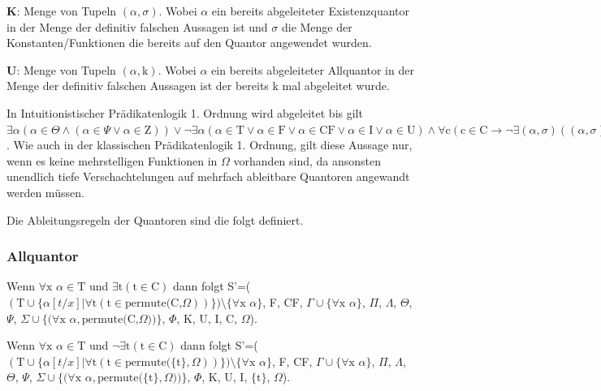 \begin{description}
\item \textbf{K}: Menge von Tupeln $(\alpha, \sigma)$. Wobei $\alpha$ ein bereits abgeleiteter Existenzquantor in der Menge der definitiv falschen Aussagen ist und $\sigma$ die Menge der Konstanten/Funktionen die bereits auf den Quantor angewendet wurden.

\item \textbf{U}: Menge von Tupeln $(\alpha, \textrm{k})$. Wobei $\alpha$ ein bereits abgeleiteter Allquantor in der Menge der definitiv falschen Aussagen ist der bereits k mal abgeleitet wurde.
\end{description}

In Intuitionistischer Prädikatenlogik 1. Ordnung wird abgeleitet bis gilt $\exists\alpha(\alpha\in\Theta\wedge(\alpha\in\Psi\vee\alpha\in\textrm{Z}))\vee\neg\exists\alpha(\alpha\in\textrm{T}\vee\alpha\in\textrm{F}\vee\alpha\in\textrm{CF}\vee\alpha\in\textrm{I}\vee\alpha\in\textrm{U})\wedge\forall\textrm{c}(\textrm{c}\in\textrm{C}\rightarrow\neg\exists(\alpha,\sigma)((\alpha,\sigma)\in\Sigma\wedge\textrm{c}\notin\sigma)\wedge\neg\exists(\alpha,\sigma)((\alpha,\sigma)\in\Phi\wedge\textrm{c}\notin\sigma)\wedge\neg\exists(\alpha,\sigma)((\alpha,\sigma)\in\textrm{K}\wedge\textrm{c}\notin\sigma))$. Wie auch in der klassischen Prädikatenlogik 1. Ordnung, gilt diese Aussage nur, wenn es keine mehrstelligen Funktionen in $\Omega$ vorhanden sind, da ansonsten unendlich tiefe Verschachtelungen auf mehrfach ableitbare Quantoren angewandt werden müssen.

Die Ableitungsregeln der Quantoren sind die folgt definiert.
\subsubsection{Allquantor}
Wenn $\forall\textrm{x}$ $\alpha\in\textrm{T}$ und $\exists\textrm{t}(\textrm{t}\in\textrm{C})$ dann folgt S'=($(\textrm{T}\cup\lbrace\alpha[t/x]|\forall\textrm{t}(\textrm{t}\in\textrm{permute(C,}\Omega))\rbrace)\setminus\lbrace\forall\textrm{x}$ $\alpha\rbrace$, F, CF, $\Gamma\cup\lbrace\forall\textrm{x}$ $\alpha\rbrace$, $\Pi$, $\Lambda$, $\Theta$, $\Psi$, $\Sigma\cup\lbrace(\forall\textrm{x}$ $\alpha,\textrm{permute(C,}\Omega))\rbrace$, $\Phi$, K, U, I, C, $\Omega$).

Wenn $\forall\textrm{x}$ $\alpha\in\textrm{T}$ und $\neg\exists\textrm{t}(\textrm{t}\in\textrm{C})$ dann folgt S'=($(\textrm{T}\cup\lbrace\alpha[t/x]|\forall\textrm{t}(\textrm{t}\in\textrm{permute(}\lbrace\textrm{t}\rbrace,\Omega))\rbrace)\setminus\lbrace\forall\textrm{x}$ $\alpha\rbrace$, F, CF, $\Gamma\cup\lbrace\forall\textrm{x}$ $\alpha\rbrace$, $\Pi$, $\Lambda$, $\Theta$, $\Psi$, $\Sigma\cup\lbrace(\forall\textrm{x}$ $\alpha,\textrm{permute(}\lbrace\textrm{t}\rbrace,\Omega))\rbrace$, $\Phi$, K, U, I, $\lbrace\textrm{t}\rbrace$, $\Omega$).


